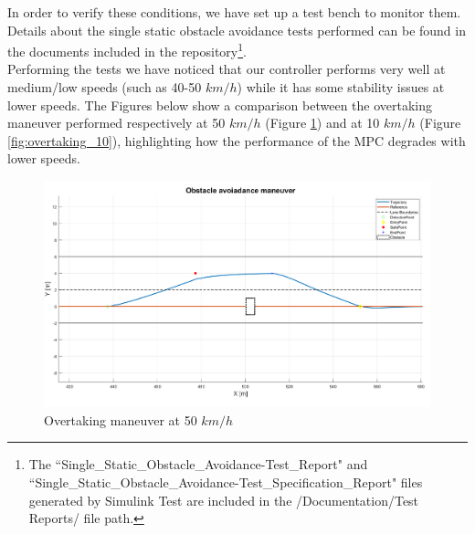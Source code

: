 In order to verify these conditions, we have set up a test bench to monitor them.
Details about the single static obstacle avoidance tests performed can be found in the documents included in the repository\footnote{The ``Single\_Static\_Obstacle\_Avoidance-Test\_Report" and ``Single\_Static\_Obstacle\_Avoidance-Test\_Specification\_Report" files generated by Simulink Test are included in the /Documentation/Test Reports/ file path.}.\\
Performing the tests we have noticed that our controller performs very well at medium/low speeds (such as 40-50 $km/h$) while it has some stability issues at lower speeds. The Figures below show a comparison between the overtaking maneuver performed respectively at 50 $km/h$ (Figure \ref{fig:overtaking_50}) and at 10 $km/h$ (Figure \ref{fig:overtaking_10}), highlighting how the performance of the MPC degrades with lower speeds.

\begin{figure}[H]
    \centering
   \includegraphics[width=1\textwidth,keepaspectratio]{Figures/StaticAvoidance1.png}
    \caption{Overtaking maneuver at 50 $km/h$}
    \label{fig:overtaking_50}
\end{figure}

